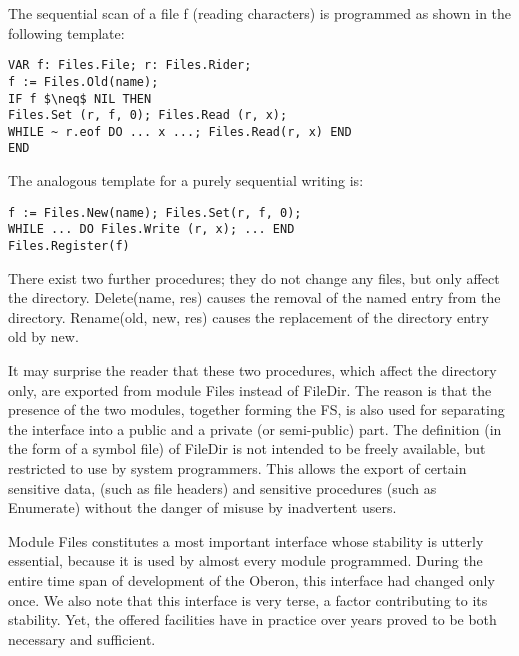 The sequential scan of a file f (reading characters) is programmed as shown in the following
template:
\begin{verbatim}
VAR f: Files.File; r: Files.Rider;
f := Files.Old(name);
IF f $\neq$ NIL THEN
Files.Set (r, f, 0); Files.Read (r, x);
WHILE ~ r.eof DO ... x ...; Files.Read(r, x) END
END
\end{verbatim}

The analogous template for a purely sequential writing is:
\begin{verbatim}
f := Files.New(name); Files.Set(r, f, 0);
WHILE ... DO Files.Write (r, x); ... END
Files.Register(f)
\end{verbatim}

There exist two further procedures; they do not change any files, but only affect the directory.
Delete(name, res) causes the removal of the named entry from the directory. Rename(old, new,
res) causes the replacement of the directory entry old by new.

It may surprise the reader that these two procedures, which affect the directory only, are exported
from module Files instead of FileDir. The reason is that the presence of the two modules,
together forming the FS, is also used for separating the interface into a public and a
private (or semi-public) part. The definition (in the form of a symbol file) of FileDir is not intended
to be freely available, but restricted to use by system programmers. This allows the export of
certain sensitive data, (such as file headers) and sensitive procedures (such as Enumerate)
without the danger of misuse by inadvertent users.

Module Files constitutes a most important interface whose stability is utterly essential, because it
is used by almost every module programmed. During the entire time span of development of the
Oberon, this interface had changed only once. We also note that this interface is very
terse, a factor contributing to its stability. Yet, the offered facilities have in practice over years
proved to be both necessary and sufficient.
